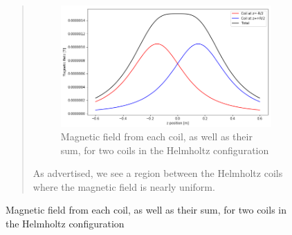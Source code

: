 \begin{framed}
\begin{figure}[!htbp]
\centering
\begin{quote}
\begin{figure}[!htbp]
\centering
\includegraphics[width=0.8\linewidth]{files/helmholtzcoil-179de3570ec926b3e29eaadde6cb1a4b.png}
\caption[]{Magnetic field from each coil, as well as their sum, for two coils in the Helmholtz configuration}
\label{fig:magneticsource:helmholtzcoil}
\end{figure}

As advertised, we see a region between the Helmholtz coils where the magnetic field is nearly uniform.
\end{quote}
\end{figure}
\end{framed}
